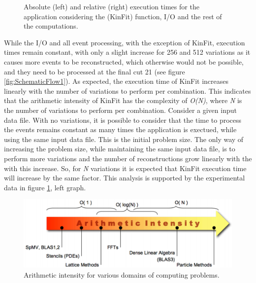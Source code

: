\begin{figure}
\begin{minipage}{.5\textwidth}
	\end{minipage}
	\caption{Absolute (left) and relative (right) execution times for the \tth application considering the \ttDilepKinFit (KinFit) function, I/O and the rest of the computations.}
	\label{fig:KinFitGraph}
\end{figure}

While the I/O and all event processing, with the exception of KinFit, execution times remain constant, with only a slight increase for 256 and 512 variations as it causes more events to be reconstructed, which otherwise would not be possible, and they need to be processed at the final cut 21 (see figure \ref{fig:SchematicFlow1}). As expected, the execution time of KinFit increases linearly with the number of variations to perform per combination. This indicates that the arithmetic intensity of KinFit has the complexity of \textit{O(N)}, where \textit{N} is the number of variations to perform per combination. Consider a given input data file. With no variations, it is possible to consider that the time to process the events remains constant as many times the application is exectued, while using the same input data file. This is the initial problem size. The only way of increasing the problem size, while maintaining the same input data file, is to perform more variations and the number of reconstructions grow linearly with the with this increase. So, for \textit{N} variations it is expected that KinFit execution time will increase by the same factor. This analysis is supported by the experimental data in figure \ref{fig:KinFitGraph}, left graph.

\begin{figure}[!htp]
	\begin{center}
		\includegraphics[scale=0.6]{../../common/img/arithmetic_intensity.png}  
		\caption{Arithmetic intensity for various domains of computing problems.}
		\label{fig:ArithmeticIntensity}
	\end{center}
\end{figure}

